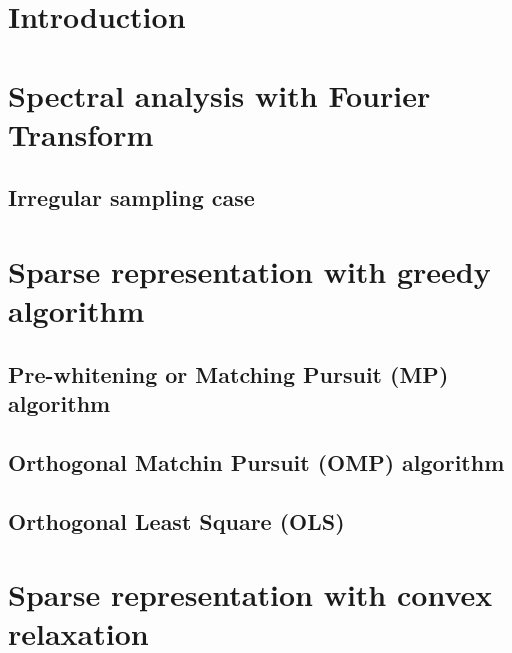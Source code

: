 
\section{Introduction}



\section{Spectral analysis with Fourier Transform}

\subsection{Irregular sampling case}



\section{Sparse representation with greedy algorithm}

\subsection{Pre-whitening or Matching Pursuit (MP) algorithm}


\subsection{Orthogonal Matchin Pursuit (OMP) algorithm}

\subsection{Orthogonal Least Square (OLS)}



\section{Sparse representation with convex relaxation}

